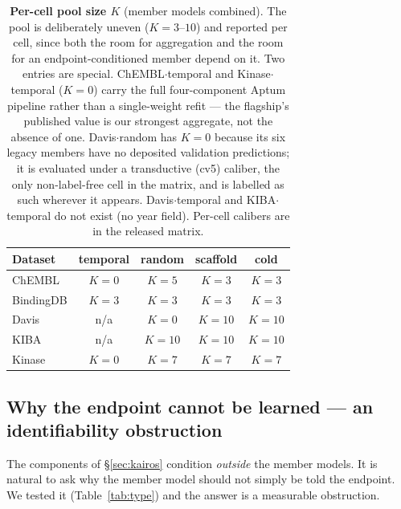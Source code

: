 \documentclass[10pt,letterpaper]{article}
\begin{document}
\begin{table}[htbp]
\centering
\small
\caption{\textbf{Per-cell pool size $K$} (member models combined). The pool is
deliberately uneven ($K=3$--$10$) and reported per cell, since both the room for
aggregation and the room for an endpoint-conditioned member depend on it. Two entries
are special. ChEMBL$\cdot$temporal and Kinase$\cdot$temporal ($K{=}0$) carry the full
four-component Aptum pipeline rather than a single-weight refit --- the flagship's
published value is our strongest aggregate, not the absence of one. Davis$\cdot$random
has $K{=}0$ because its six legacy members have no deposited validation predictions;
it is evaluated under a transductive (cv5) caliber, the only non-label-free cell in the
matrix, and is labelled as such wherever it appears. Davis$\cdot$temporal and
KIBA$\cdot$temporal do not exist (no year field). Per-cell calibers are in the released
matrix.}
\label{tab:pool}
\begin{tabular*}{\linewidth}{@{\extracolsep{\fill}}@{}lcccc@{}}
\toprule
Dataset & temporal & random & scaffold & cold \\
\midrule
ChEMBL & $K{=}0$ & $K{=}5$ & $K{=}3$ & $K{=}3$ \\
BindingDB & $K{=}3$ & $K{=}3$ & $K{=}3$ & $K{=}3$ \\
Davis & n/a & $K{=}0$ & $K{=}10$ & $K{=}10$ \\
KIBA & n/a & $K{=}10$ & $K{=}10$ & $K{=}10$ \\
Kinase & $K{=}0$ & $K{=}7$ & $K{=}7$ & $K{=}7$ \\
\bottomrule
\end{tabular*}
\end{table}

\subsection{Why the endpoint cannot be learned --- an identifiability obstruction}
\label{sec:type}

The components of \S\ref{sec:kairos} condition \emph{outside} the member models. It is
natural to ask why the member model should not simply be told the endpoint. We tested
it (Table~\ref{tab:type}) and the answer is a measurable obstruction.
\end{document}
